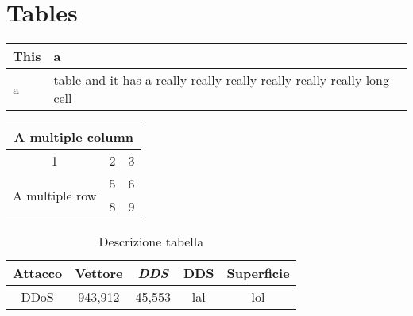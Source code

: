 \setlength{\tabcolsep}{18pt} %
\renewcommand{\arraystretch}{1.5} %
\setlength{\arrayrulewidth}{0.5mm} %


\section{Tables}

\begin{tabular}{|l|b{4cm}|}
    \hline
    This & a\\ \hline
    a & table and it has a really really really really really really long cell \\ \hline
\end{tabular}

\vspace{1in}

\begin{tabular}{|c|c|c|}
    \hline
    \multicolumn{3}{|c|}{A multiple column} \\ \hline
    1 & 2 & 3 \\\hline 
    \multirow{2}{2cm}{A multiple row} & 5 & 6\\
     & 8 & 9 \\ \hline
\end{tabular}


\newpage
\begin{table}[!h]
    
    \begin{tabular}{|c|c|c|c|c|}
        \hline
        \textbf{Attacco} & \textbf{Vettore} & \textbf{\textit{DDS}} & \textbf{DDS } & \textbf{Superficie}\\ \hline
        DDoS & 943,912& 45,553 & lal & lol\\ \hline 
    \end{tabular}
\caption{Descrizione tabella}
\end{table}